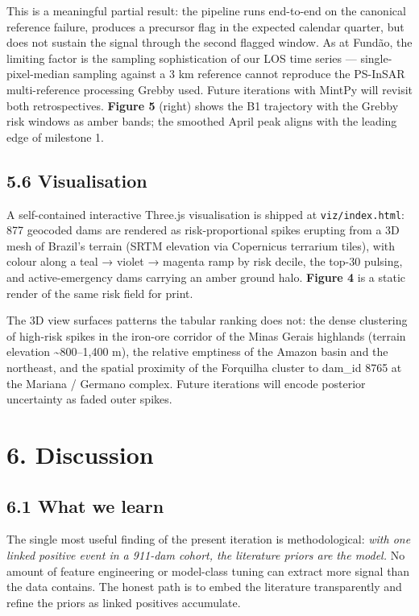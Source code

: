 \documentclass[
  11pt]{article}
\begin{document}
This is a meaningful partial result: the pipeline runs end-to-end on the
canonical reference failure, produces a precursor flag in the expected
calendar quarter, but does not sustain the signal through the second
flagged window. As at Fundão, the limiting factor is the sampling
sophistication of our LOS time series --- single-pixel-median sampling
against a 3 km reference cannot reproduce the PS-InSAR multi-reference
processing Grebby used. Future iterations with MintPy will revisit both
retrospectives. \textbf{Figure 5} (right) shows the B1 trajectory with
the Grebby risk windows as amber bands; the smoothed April peak aligns
with the leading edge of milestone 1.

\subsection{5.6 Visualisation}\label{visualisation}

A self-contained interactive Three.js visualisation is shipped at
\texttt{viz/index.html}: 877 geocoded dams are rendered as
risk-proportional spikes erupting from a 3D mesh of Brazil's terrain
(SRTM elevation via Copernicus terrarium tiles), with colour along a
teal → violet → magenta ramp by risk decile, the top-30 pulsing, and
active-emergency dams carrying an amber ground halo. \textbf{Figure 4}
is a static render of the same risk field for print.

The 3D view surfaces patterns the tabular ranking does not: the dense
clustering of high-risk spikes in the iron-ore corridor of the Minas
Gerais highlands (terrain elevation \textasciitilde800--1,400 m), the
relative emptiness of the Amazon basin and the northeast, and the
spatial proximity of the Forquilha cluster to dam\_id 8765 at the
Mariana / Germano complex. Future iterations will encode posterior
uncertainty as faded outer spikes.

\section{6. Discussion}\label{discussion}

\subsection{6.1 What we learn}\label{what-we-learn}

The single most useful finding of the present iteration is
methodological: \emph{with one linked positive event in a 911-dam
cohort, the literature priors are the model.} No amount of feature
engineering or model-class tuning can extract more signal than the data
contains. The honest path is to embed the literature transparently and
refine the priors as linked positives accumulate.
\end{document}
